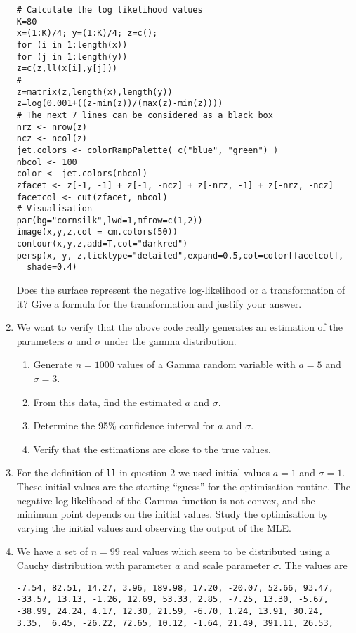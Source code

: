 \documentclass[a4paper,10pt]{article}
\begin{document}
\begin{enumerate}
\begin{lstlisting}
# Calculate the log likelihood values 
K=80
x=(1:K)/4; y=(1:K)/4; z=c();
for (i in 1:length(x))
for (j in 1:length(y))
z=c(z,ll(x[i],y[j]))
# 
z=matrix(z,length(x),length(y))
z=log(0.001+((z-min(z))/(max(z)-min(z))))
# The next 7 lines can be considered as a black box 
nrz <- nrow(z)
ncz <- ncol(z)
jet.colors <- colorRampPalette( c("blue", "green") )
nbcol <- 100
color <- jet.colors(nbcol)
zfacet <- z[-1, -1] + z[-1, -ncz] + z[-nrz, -1] + z[-nrz, -ncz]
facetcol <- cut(zfacet, nbcol)
# Visualisation 
par(bg="cornsilk",lwd=1,mfrow=c(1,2))
image(x,y,z,col = cm.colors(50))
contour(x,y,z,add=T,col="darkred")
persp(x, y, z,ticktype="detailed",expand=0.5,col=color[facetcol],
  shade=0.4)
\end{lstlisting}
Does the surface represent the negative log-likelihood or a transformation of it? Give a formula for the transformation and justify your answer. 
\item We want to verify that the above code really generates an estimation of the parameters $a$ and $\sigma$ under the gamma distribution. 
\begin{enumerate}
\item Generate $n=1000$ values of a Gamma random variable with $a=5$ and $\sigma=3$. 
\item From this data, find the estimated $a$ and $\sigma$. 
\item Determine the 95\% confidence interval for $a$ and $\sigma$. 
\item Verify that the estimations are close to the true values. 
\end{enumerate}
\item For the definition of \texttt{ll} in question 2 we used initial values $a=1$ and $\sigma=1$. These initial values are the starting ``guess'' for the optimisation routine. The negative log-likelihood of the Gamma function is not convex, and the minimum point depends on the initial values. Study the optimisation by varying the initial values and observing the output of the MLE. 
\item We have a set of $n=99$ real values which seem to be distributed using a Cauchy distribution with parameter $a$ and scale parameter $\sigma$. The values are 
\begin{lstlisting}
-7.54, 82.51, 14.27, 3.96, 189.98, 17.20, -20.07, 52.66, 93.47, 
-33.57, 13.13, -1.26, 12.69, 53.33, 2.85, -7.25, 13.30, -5.67, 
-38.99, 24.24, 4.17, 12.30, 21.59, -6.70, 1.24, 13.91, 30.24, 
3.35,  6.45, -26.22, 72.65, 10.12, -1.64, 21.49, 391.11, 26.53, 

\end{lstlisting}
\end{enumerate}
\end{document}
